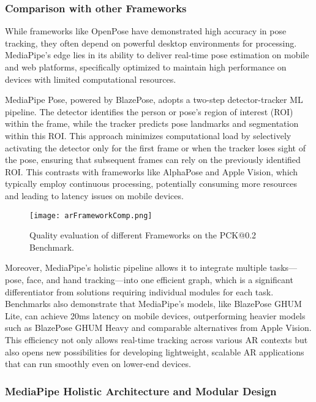 \subsubsection{Comparison with other Frameworks}

While frameworks like OpenPose\cite{cao2017realtime} have demonstrated high accuracy in pose tracking, they often depend on powerful desktop environments for processing.
MediaPipe’s edge lies in its ability to deliver real-time pose estimation on mobile and web platforms, specifically optimized to maintain high performance on devices with limited computational resources.

MediaPipe Pose, powered by BlazePose\cite{bazarevsky2020blazepose}, adopts a two-step detector-tracker ML pipeline. The detector identifies the person or pose’s region of interest (ROI) within the frame, while the tracker predicts pose landmarks and segmentation within this ROI.
This approach minimizes computational load by selectively activating the detector only for the first frame or when the tracker loses sight of the pose, ensuring that subsequent frames can rely on the previously identified ROI.
This contrasts with frameworks like AlphaPose and Apple Vision, which typically employ continuous processing, potentially consuming more resources and leading to latency issues on mobile devices.
\begin{figure}[!h]
    \centering
    \texttt{[image: arFrameworkComp.png]}
    \caption{Quality evaluation of different Frameworks on the PCK@0.2 Benchmark.}
    \vspace{0.1cm}
    \label{fig:arFrameworks}
\end{figure}
Moreover, MediaPipe’s holistic pipeline allows it to integrate multiple tasks—pose, face, and hand tracking—into one efficient graph, which is a significant differentiator from solutions requiring individual modules for each task.
Benchmarks also demonstrate that MediaPipe’s models, like BlazePose GHUM Lite, can achieve 20ms latency on mobile devices, outperforming heavier models such as BlazePose GHUM Heavy and comparable alternatives from Apple Vision.
This efficiency not only allows real-time tracking across various AR contexts but also opens new possibilities for developing lightweight, scalable AR applications that can run smoothly even on lower-end devices.

\subsubsection{MediaPipe Holistic Architecture and Modular Design}


